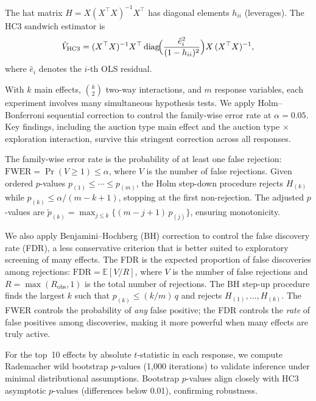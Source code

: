 The hat matrix $H = X(X^\top X)^{-1}X^\top$ has diagonal elements $h_{ii}$ (leverages). The HC3 sandwich estimator is
\begin{align}
  \hat{V}_{\text{HC3}} = (X^\top X)^{-1} X^\top \operatorname{diag}\!\Bigl(\frac{\hat{e}_i^2}{(1-h_{ii})^2}\Bigr) X\, (X^\top X)^{-1},
  \label{eq:hc3}
\end{align}
where $\hat{e}_i$ denotes the $i$-th OLS residual.

With $k$ main effects, $\binom{k}{2}$ two-way interactions, and $m$ response variables, each experiment involves many simultaneous hypothesis tests. We apply Holm--Bonferroni sequential correction \citep{Holm1979} to control the family-wise error rate at $\alpha = 0.05$. Key findings, including the auction type main effect and the auction type $\times$ exploration interaction, survive this stringent correction across all responses.

The family-wise error rate is the probability of at least one false rejection: $\text{FWER} = \Pr(V \geq 1) \leq \alpha$, where $V$ is the number of false rejections. Given ordered $p$-values $p_{(1)} \leq \cdots \leq p_{(m)}$, the Holm step-down procedure rejects $H_{(k)}$ while $p_{(k)} \leq \alpha/(m - k + 1)$, stopping at the first non-rejection. The adjusted $p$-values are $\tilde{p}_{(k)} = \max_{j \leq k}\{(m - j + 1)\,p_{(j)}\}$, ensuring monotonicity.

We also apply Benjamini--Hochberg (BH) correction \citep{BenjaminiHochberg1995} to control the false discovery rate (FDR), a less conservative criterion that is better suited to exploratory screening of many effects. The FDR is the expected proportion of false discoveries among rejections: $\text{FDR} = \mathbb{E}[V/R]$, where $V$ is the number of false rejections and $R = \max(R_{\text{obs}}, 1)$ is the total number of rejections. The BH step-up procedure finds the largest $k$ such that $p_{(k)} \leq (k/m)\,q$ and rejects $H_{(1)}, \ldots, H_{(k)}$. The FWER controls the probability of \emph{any} false positive; the FDR controls the \emph{rate} of false positives among discoveries, making it more powerful when many effects are truly active.

For the top~10 effects by absolute $t$-statistic in each response, we compute Rademacher wild bootstrap $p$-values (1{,}000 iterations) to validate inference under minimal distributional assumptions. Bootstrap $p$-values align closely with HC3 asymptotic $p$-values (differences below 0.01), confirming robustness.

